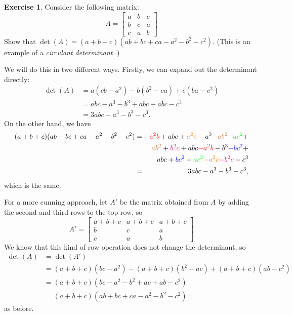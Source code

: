\documentclass[a4paper]{book}
\newcommand{\RED}[1]{{\color{red}#1}}
\newcommand{\BLUE}[1]{{\color{blue}#1}}
\newcommand{\GREEN}[1]{{\color{green}#1}}
\newcommand{\PURPLE}[1]{{\color{purple}#1}}
\newcommand{\ORANGE}[1]{{\color{orange}#1}}
\newcommand{\BROWN}[1]{{\color{brown}#1}}
\newcommand{\MAGENTA}[1]{{\color{magenta}#1}}
\newcommand{\bbm}       {\begin{bmatrix}}
\newcommand{\ebm}       {\end{bmatrix}}
\renewcommand{\:}{\colon}
\newcommand{\mathworld}[1]{}
\newcommand{\DEFN}[1]{\PURPLE{\emph{#1}}}
\theoremstyle{definition}
\newtheorem{exercise}[theorem]{Exercise}
\renewenvironment{solution}{\SolutionInline}{\endSolutionInline}
\begin{document}
\begin{exercise}
 Consider the following matrix:
 \[ A = \bbm
          a   & b   & c   \\
          b   & c   & a   \\
          c   & a   & b
        \ebm
 \]
 Show that $\det(A)=(a+b+c)(ab+bc+ca-a^2-b^2-c^2)$.
 (This is an example of a \DEFN{circulant determinant}
  \mathworld{CirculantMatrix}.)
\end{exercise}
\begin{solution}
 We will do this in two different ways.  Firstly, we can expand out
 the determinant directly:
 \begin{align*}
  \det(A) &= a(cb-a^2) - b(b^2-ca) + c(ba-c^2) \\
          &= abc - a^3 - b^3 + abc + abc - c^3 \\
          &= 3abc - a^3 - b^3 - c^3.
 \end{align*}
 On the other hand, we have
 \begin{eqnarray*}
  (a+b+c)(ab+bc+ca-a^2-b^2-c^2)
   &=&   \RED{a^2b}
       + abc
       + \ORANGE{a^2c}
       - a^3
       \BROWN{- ab^2}
       \GREEN{- ac^2} + \\
   & &   \BROWN{ ab^2}
       + \MAGENTA{ b^2c}
       + abc
       \RED{ - a^2b}
       - b^3
       \BLUE{ - bc^2} + \\
   & &   abc
       + \BLUE{ bc^2}
       + \GREEN{ ac^2}
       \ORANGE{ - a^2c}
       \MAGENTA{ - b^2c}
       - c^3 \\
   &=&  3abc - a^3 - b^3 - c^3,
 \end{eqnarray*}
 which is the same.

 For a more cunning approach, let $A'$ be the matrix obtained from $A$
 by adding the second and third rows to the top row, so
 \[ A' = \bbm
           a+b+c & a+b+c & a+b+c \\
           b     & c     & a     \\
           c     & a     & b
         \ebm
 \]
 We know that this kind of row operation does not change the
 determinant, so
 \begin{align*}
  \det(A) &= \det(A') \\
          &= (a+b+c)(bc-a^2) - (a+b+c)(b^2-ac) + (a+b+c)(ab-c^2) \\
          &= (a+b+c)(bc-a^2-b^2+ac+ab-c^2) \\
          &= (a+b+c)(ab+bc+ca-a^2-b^2-c^2)
 \end{align*}
 as before.
\end{solution}
\end{document}
